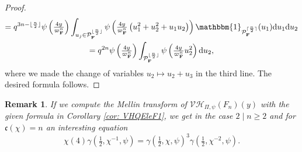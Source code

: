 \documentclass[A4]{amsart}
\def\geq{\geqslant}
\newtheorem{remark} [theorem] {Remark}
\numberwithin{equation}{section} \everymath{\displaystyle}
\newcommand{\id}{\mathbbm{1}}
\newcommand{\ud}{\mathrm{d}}
\newcommand{\F}{\mathbf{F}}
\newcommand{\vP}{\mathcal{P}}
\newcommand{\VorH}{\mathcal{VH}}
\newcommand{\cond}{\mathfrak{c}}
\begin{document}
\begin{proof}
\begin{multline*}
	= q^{3n-\lfloor \frac{n}{2} \rfloor} \psi \left( \tfrac{4y}{\varpi_{\F}^n} \right) \int_{u_j \in \vP_{\F}^{\lfloor \frac{n}{2} \rfloor}} \psi \left( \tfrac{4y}{\varpi_{\F}^n} \left( u_1^2 + u_2^2 + u_1u_2 \right) \right) \id_{\vP_{\F}^{\lceil \frac{n}{2} \rceil}}(u_1) \ud u_1 \ud u_2 \\
	= q^{2n} \psi \left( \tfrac{4y}{\varpi_{\F}^n} \right) \int_{\vP_{\F}^{\lfloor \frac{n}{2} \rfloor}} \psi \left( \tfrac{4y}{\varpi_{\F}^n} u_2^2 \right) \ud u_2,
\end{multline*}
	where we made the change of variables $u_2 \mapsto u_2 + u_3$ in the third line. The desired formula follows.
\end{proof}

\begin{remark}
	If we compute the Mellin transform of $\VorH_{\Pi,\psi}(F_n)(y)$ with the given formula in Corollary \ref{cor: VHQEleF1}, we get in the case $2 \mid n \geq 2$ and for $\cond(\chi)=n$ an interesting equation
	$$ \chi(4) \gamma \left( \tfrac{1}{2}, \chi^{-1}, \psi \right) = \gamma \left( \tfrac{1}{2}, \chi, \psi \right)^3 \gamma \left( \tfrac{1}{2}, \chi^{-2}, \psi \right). $$
\end{remark}
\end{document}
